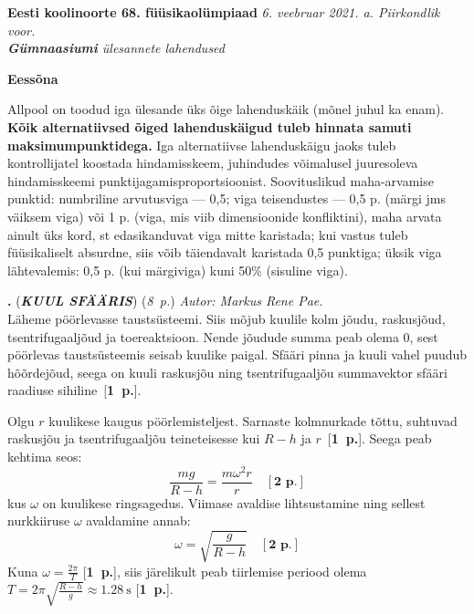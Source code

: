 \documentclass[12pt,a5paper]{article}
\newcommand{\numb}[1]{\textbf{\large #1}}
\newcommand{\nimi}[1]{(\textsl{\small #1})}
\newcommand{\punktid}[1]{(\emph{#1~p.})}
\newcounter{ylesanne}
\newcommand{\yl}[1]{\addtocounter{ylesanne}{1}\newpage\numb{\theylesanne.} \nimi{\textbf{#1}} \newblock{}}
\newcommand{\pp}[1]{[\textbf{#1~p.}]}
\newcommand{\autor}[1]{\emph{ Autor: #1.\\}}
\begin{document}
\begin{center}
  \textbf{\Large Eesti koolinoorte 68. füüsikaolümpiaad} \vspace{3pt}
  \emph{6. veebruar 2021. a. Piirkondlik voor.\\ \textbf{Gümnaasiumi} ülesannete lahendused}
\end{center}
\vspace{-10pt}
\numb{Eessõna}

Allpool on toodud iga ülesande üks õige lahenduskäik (mõnel juhul ka
enam). \textbf{Kõik alternatiivsed õiged lahenduskäigud tuleb hinnata samuti
maksimumpunktidega.} Iga alternatiivse lahenduskäigu jaoks tuleb
kontrollijatel koostada hindamisskeem, juhindudes võimalusel juuresoleva
hindamisskeemi punktijagamisproportsioonist. Soovituslikud
maha-arvamise punktid: numbriline arvutusviga --- 0,5; viga
teisendustes --- 0,5 p. (märgi jms väiksem viga) või 1 p. (viga, mis
viib dimensioonide konfliktini), maha arvata ainult üks kord, st
edasikanduvat viga mitte karistada; kui vastus tuleb füüsikaliselt
absurdne, siis võib täiendavalt karistada 0,5 punktiga; üksik viga
lähtevalemis: 0,5 p. (kui märgiviga) kuni 50\% (sisuline viga).
\vspace{20pt}

\yl{KUUL SFÄÄRIS}\punktid{8}\autor{Markus Rene Pae}
Läheme pöörlevasse taustsüsteemi. Siis mõjub kuulile kolm jõudu, raskusjõud, tsentrifugaaljõud ja toereaktsioon. Nende jõudude summa peab olema 0, sest pöörlevas taustsüsteemis seisab kuulike paigal. Sfääri pinna ja kuuli vahel puudub hõõrdejõud, seega on kuuli raskusjõu ning tsentrifugaaljõu summavektor sfääri raadiuse sihiline~\pp{1}.\par
Olgu $r$ kuulikese kaugus pöörlemisteljest. Sarnaste kolmnurkade tõttu, suhtuvad raskusjõu ja tsentrifugaaljõu teineteisesse kui $R-h$ ja $r$~\pp{1}. Seega peab kehtima seos:
$$ \frac{mg}{R-h} = \frac{m \omega^2 r}{r} \quad \pp2$$
kus $\omega$ on kuulikese ringsagedus. Viimase avaldise lihtsustamine ning sellest nurkkiiruse $\omega$ avaldamine annab:
$$ \omega = \sqrt{\frac{g}{R-h}} \quad \pp2$$
Kuna $\omega = \frac{2\pi}{T}$ \pp{1}, siis järelikult peab tiirlemise periood olema $T = 2 \pi \sqrt{\frac{R-h}{g}} \approx \SI{1.28}{\second}$ \pp{1}.
\end{document}
